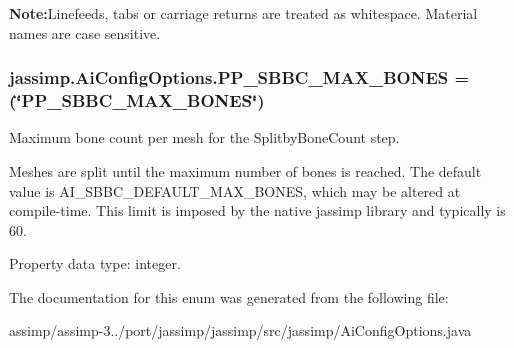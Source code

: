 {\bfseries Note\+:}Linefeeds, tabs or carriage returns are treated as whitespace. Material names are case sensitive. \hypertarget{enumjassimp_1_1_ai_config_options_a044117d630c7f6988ebf8988a121260f}{
\subsubsection[{P\+P\+\_\+\+S\+B\+B\+C\+\_\+\+M\+A\+X\+\_\+\+B\+O\+N\+E\+S}]{\setlength{\rightskip}{0pt plus 5cm}jassimp.\+Ai\+Config\+Options.\+P\+P\+\_\+\+S\+B\+B\+C\+\_\+\+M\+A\+X\+\_\+\+B\+O\+N\+E\+S =(\char`\"{}P\+P\+\_\+\+S\+B\+B\+C\+\_\+\+M\+A\+X\+\_\+\+B\+O\+N\+E\+S\char`\"{})}}\label{enumjassimp_1_1_ai_config_options_a044117d630c7f6988ebf8988a121260f}
Maximum bone count per mesh for the Splitby\+Bone\+Count step.

Meshes are split until the maximum number of bones is reached. The default value is A\+I\+\_\+\+S\+B\+B\+C\+\_\+\+D\+E\+F\+A\+U\+L\+T\+\_\+\+M\+A\+X\+\_\+\+B\+O\+N\+E\+S, which may be altered at compile-\/time. This limit is imposed by the native jassimp library and typically is 60.

Property data type\+: integer. 

The documentation for this enum was generated from the following file\+:\begin{DoxyCompactItemize}
\item 
assimp/assimp-\/3../port/jassimp/jassimp/src/jassimp/Ai\+Config\+Options.\+java\end{DoxyCompactItemize}
